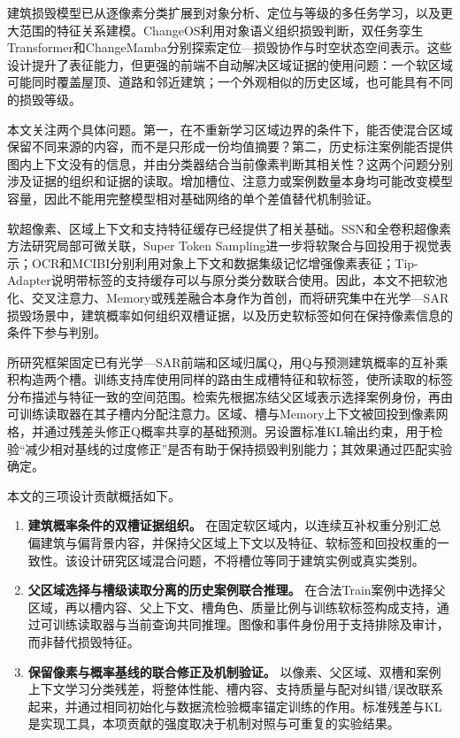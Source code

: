 \documentclass[UTF8,a4paper,zihao=-4,fontset=none]{ctexart}
\providecommand{\tightlist}{\setlength{\itemsep}{0pt}\setlength{\parskip}{0pt}}
\begin{document}
建筑损毁模型已从逐像素分类扩展到对象分析、定位与等级的多任务学习，以及更大范围的特征关系建模。ChangeOS利用对象语义组织损毁判断，双任务孪生Transformer和ChangeMamba分别探索定位—损毁协作与时空状态空间表示\cite{ref3,ref4,ref5}。这些设计提升了表征能力，但更强的前端不自动解决区域证据的使用问题：一个软区域可能同时覆盖屋顶、道路和邻近建筑；一个外观相似的历史区域，也可能具有不同的损毁等级。

本文关注两个具体问题。第一，在不重新学习区域边界的条件下，能否使混合区域保留不同来源的内容，而不是只形成一份均值摘要？第二，历史标注案例能否提供图内上下文没有的信息，并由分类器结合当前像素判断其相关性？这两个问题分别涉及证据的组织和证据的读取。增加槽位、注意力或案例数量本身均可能改变模型容量，因此不能用完整模型相对基础网络的单个差值替代机制验证。

软超像素、区域上下文和支持特征缓存已经提供了相关基础。SSN和全卷积超像素方法研究局部可微关联，Super Token Sampling进一步将软聚合与回投用于视觉表示\cite{ref6,ref7,ref8}；OCR和MCIBI分别利用对象上下文和数据集级记忆增强像素表征\cite{ref9,ref10}；Tip-Adapter说明带标签的支持缓存可以与原分类分数联合使用\cite{ref11}。因此，本文不把软池化、交叉注意力、Memory或残差融合本身作为首创，而将研究集中在光学—SAR损毁场景中，建筑概率如何组织双槽证据，以及历史软标签如何在保持像素信息的条件下参与判别。

所研究框架固定已有光学—SAR前端和区域归属Q，用Q与预测建筑概率的互补乘积构造两个槽。训练支持库使用同样的路由生成槽特征和软标签，使所读取的标签分布描述与特征一致的空间范围。检索先根据冻结父区域表示选择案例身份，再由可训练读取器在其子槽内分配注意力。区域、槽与Memory上下文被回投到像素网格，并通过残差头修正Q概率共享的基础预测。另设置标准KL输出约束，用于检验``减少相对基线的过度修正''是否有助于保持损毁判别能力；其效果通过匹配实验确定。

本文的三项设计贡献概括如下。

\begin{enumerate}
\def\labelenumi{\arabic{enumi}.}
\tightlist
\item
  \textbf{建筑概率条件的双槽证据组织。} 在固定软区域内，以连续互补权重分别汇总偏建筑与偏背景内容，并保持父区域上下文以及特征、软标签和回投权重的一致性。该设计研究区域混合问题，不将槽位等同于建筑实例或真实类别。
\item
  \textbf{父区域选择与槽级读取分离的历史案例联合推理。} 在合法Train案例中选择父区域，再以槽内容、父上下文、槽角色、质量比例与训练软标签构成支持，通过可训练读取器与当前查询共同推理。图像和事件身份用于支持排除及审计，而非替代损毁特征。
\item
  \textbf{保留像素与概率基线的联合修正及机制验证。} 以像素、父区域、双槽和案例上下文学习分类残差，将整体性能、槽内容、支持质量与配对纠错/误改联系起来，并通过相同初始化与数据流检验概率锚定训练的作用。标准残差与KL是实现工具，本项贡献的强度取决于机制对照与可重复的实验结果。
\end{enumerate}
\end{document}
